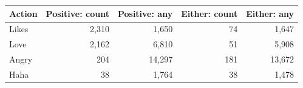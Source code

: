 \begin{tabular}{lrrrr}
\toprule
Action & Positive: count & Positive: any & Either: count & Either: any \\
\midrule
Likes & 2,310 & 1,650 & 74 & 1,647 \\
Love & 2,162 & 6,810 & 51 & 5,908 \\
Angry & 204 & 14,297 & 181 & 13,672 \\
Haha & 38 & 1,764 & 38 & 1,478 \\
\bottomrule
\end{tabular}
